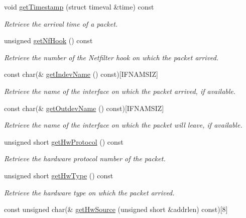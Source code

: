 \begin{DoxyCompactItemize}
void \hyperlink{classIPQ_1_1IpqPacket_a430ce4f89e651724efdf56c9c1b1647e}{get\-Timestamp} (struct timeval \&time) const 
\begin{DoxyCompactList}\small\item\em \-Retrieve the arrival time of a packet. \end{DoxyCompactList}\item 
unsigned \hyperlink{classIPQ_1_1IpqPacket_ae13884fedce165702f4b71e0e4d93c0b}{get\-Nf\-Hook} () const 
\begin{DoxyCompactList}\small\item\em \-Retrieve the number of the \-Netfilter hook on which the packet arrived. \end{DoxyCompactList}\item 
const char(\& \hyperlink{classIPQ_1_1IpqPacket_a4cf04ca5da28410f27d87edefd679532}{get\-Indev\-Name} () const)\mbox{[}\-I\-F\-N\-A\-M\-S\-I\-Z\mbox{]}
\begin{DoxyCompactList}\small\item\em \-Retrieve the name of the interface on which the packet arrived, if available. \end{DoxyCompactList}\item 
const char(\& \hyperlink{classIPQ_1_1IpqPacket_a46dced8057de3bba7abfaaa63d7afcd4}{get\-Outdev\-Name} () const)\mbox{[}\-I\-F\-N\-A\-M\-S\-I\-Z\mbox{]}
\begin{DoxyCompactList}\small\item\em \-Retrieve the name of the interface on which the packet will leave, if available. \end{DoxyCompactList}\item 
unsigned short \hyperlink{classIPQ_1_1IpqPacket_ae150e294f043f4c699231a85d3b1ae0f}{get\-Hw\-Protocol} () const 
\begin{DoxyCompactList}\small\item\em \-Retrieve the hardware protocol number of the packet. \end{DoxyCompactList}\item 
unsigned short \hyperlink{classIPQ_1_1IpqPacket_ab6b76b146111c7ad11b96e87efe6634c}{get\-Hw\-Type} () const 
\begin{DoxyCompactList}\small\item\em \-Retrieve the hardware type on which the packet arrived. \end{DoxyCompactList}\item 
const unsigned char(\& \hyperlink{classIPQ_1_1IpqPacket_a8582ae732d6b66ca1f5201994159a84a}{get\-Hw\-Source} (unsigned short \&addrlen) const)\mbox{[}8\mbox{]}

\end{DoxyCompactItemize}
